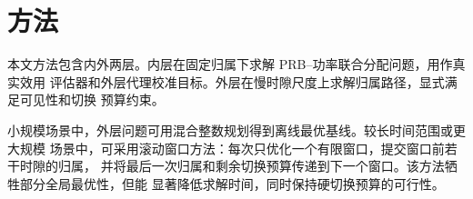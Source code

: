 
\section{方法}

本文方法包含内外两层。内层在固定归属下求解 PRB--功率联合分配问题，用作真实效用
评估器和外层代理校准目标。外层在慢时隙尺度上求解归属路径，显式满足可见性和切换
预算约束。

小规模场景中，外层问题可用混合整数规划得到离线最优基线。较长时间范围或更大规模
场景中，可采用滚动窗口方法：每次只优化一个有限窗口，提交窗口前若干时隙的归属，
并将最后一次归属和剩余切换预算传递到下一个窗口。该方法牺牲部分全局最优性，但能
显著降低求解时间，同时保持硬切换预算的可行性。

